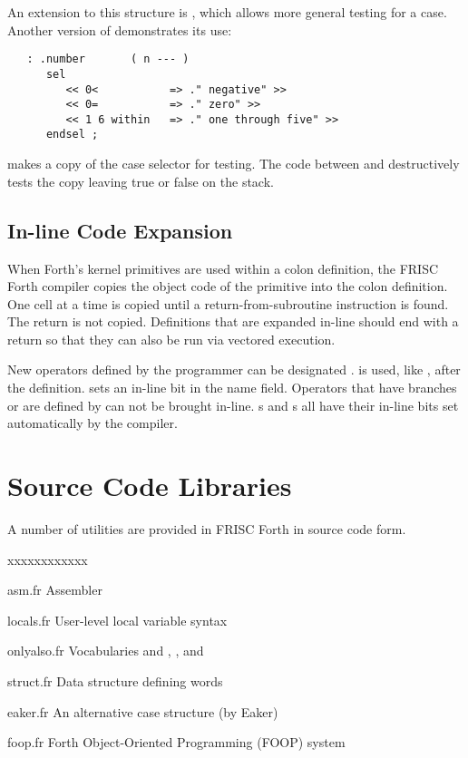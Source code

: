 An extension to this structure is \fw{=$>$}, which allows more general
testing for a case.  Another version of  demonstrates its
use:
\begin{verbatim}
   : .number       ( n --- )
      sel
         << 0<           => ." negative" >>
         << 0=           => ." zero" >>
         << 1 6 within   => ." one through five" >>
      endsel ;
\end{verbatim}
\fw{$<<$} makes a copy of the case selector for testing.  The code
between \fw{$<<$} and \fw{=$>$} destructively tests the copy leaving true
or false on the stack.

\subsection{In-line Code Expansion}
When Forth's kernel primitives are used within a colon definition, the
FRISC Forth compiler copies the object code of the primitive into the
colon definition.  One cell at a time is copied until a
return-from-subroutine instruction is found.  The return is not copied.
Definitions that are expanded in-line should end with a return so that
they can also be run via vectored execution.

New operators defined by the programmer can be designated .
 is used, like , after the definition.
 sets an in-line bit in the name field.  Operators that have
branches or are defined by  can not be brought in-line.
s and s all have their in-line bits set
automatically by the compiler.

\section{Source Code Libraries}
A number of utilities are provided in FRISC Forth in source code
form.
\begin{namelist}{xxxxxxxxxxxx}
        \item[asm.fr] Assembler
        \item[locals.fr] User-level local variable syntax
        \item[onlyalso.fr] Vocabularies and ,
                , and 
        \item[struct.fr] Data structure defining words
        \item[eaker.fr] An alternative case structure (by Eaker)
        \item[foop.fr] Forth Object-Oriented Programming (FOOP) system
\end{namelist}

